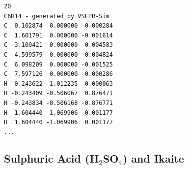 \documentclass[11pt,twoside]{article}
\begin{document}
\begin{lstlisting}[language={}, frame=single, basicstyle=\ttfamily\scriptsize, caption={Hexane XYZ output (\texttt{examples/molecules/hexane.xyz})}]
20
C6H14 - generated by VSEPR-Sim
C  0.102874  0.000000 -0.000284
C  1.601791  0.000000 -0.001614
C  3.100421  0.000000 -0.004583
C  4.599579  0.000000 -0.004824
C  6.098209  0.000000 -0.001525
C  7.597126  0.000000 -0.000286
H -0.243622  1.012235 -0.000063
H -0.243409 -0.506067  0.876471
H -0.243834 -0.506168 -0.876771
H  1.604440  1.069906  0.001177
H  1.604440 -1.069906  0.001177
...
\end{lstlisting}

\subsection{Sulphuric Acid (H$_2$SO$_4$) and Ikaite}
\end{document}
